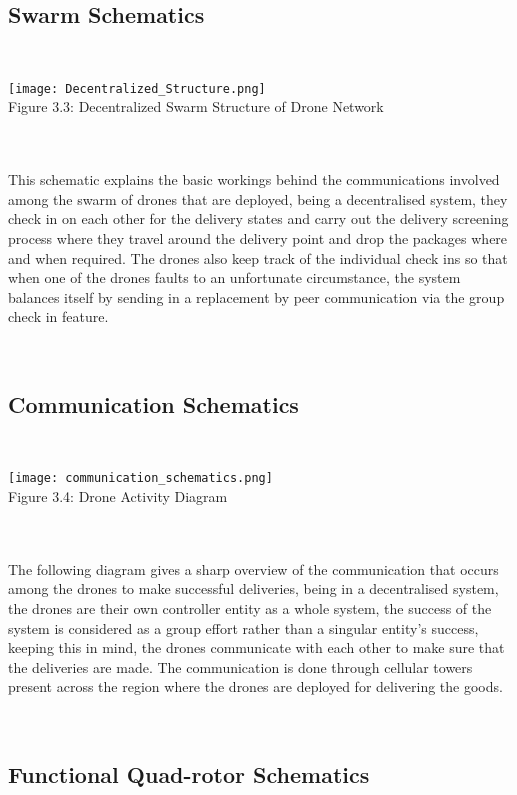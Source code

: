 \documentclass[conference]{IEEEtran}
\begin{document}
\subsection{Swarm Schematics}\\
\graphicspath{ {./images/} }
\texttt{[image: Decentralized\_Structure.png]}\\
\caption{Figure 3.3: Decentralized Swarm Structure of Drone Network}\\\\
\caption{ This schematic explains the basic workings behind the communications involved among the swarm of drones that are deployed, being a decentralised system, they check in on each other for the delivery states and carry out the delivery screening process where they travel around the delivery point and drop the packages where and when required. The drones also keep track of the individual check ins so that when one of the drones faults to an unfortunate circumstance, the system balances itself by sending in a replacement by peer communication via the group check in feature.
}\\

\subsection{Communication Schematics}\\

\graphicspath{ {./images/} }
\texttt{[image: communication\_schematics.png]}\\
\caption{Figure 3.4: Drone Activity Diagram}\\\\
\caption{ The following diagram gives a sharp overview of the communication that occurs among the drones to make successful deliveries, being in a decentralised system, the drones are their own controller entity as a whole system, the success of the system is considered as a group effort rather than a singular entity’s success, keeping this in mind, the drones communicate with each other to make sure that the deliveries are made. The communication is done through cellular towers present across the region where the drones are deployed for delivering the goods.
}\\

\subsection{Functional Quad-rotor Schematics}\\
\end{document}
